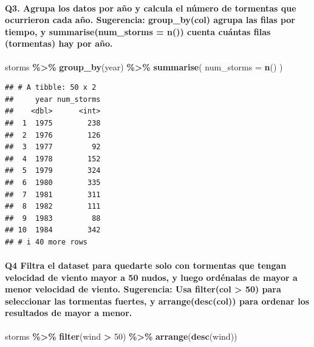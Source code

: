 \documentclass[
]{article}
\newenvironment{Shaded}{\begin{snugshade}}{\end{snugshade}}
\newcommand{\AttributeTok}[1]{\textcolor[rgb]{0.13,0.29,0.53}{#1}}
\newcommand{\DecValTok}[1]{\textcolor[rgb]{0.00,0.00,0.81}{#1}}
\newcommand{\FunctionTok}[1]{\textcolor[rgb]{0.13,0.29,0.53}{\textbf{#1}}}
\newcommand{\NormalTok}[1]{#1}
\newcommand{\SpecialCharTok}[1]{\textcolor[rgb]{0.81,0.36,0.00}{\textbf{#1}}}
\begin{document}
\paragraph{Q3. Agrupa los datos por año y calcula el número de tormentas
que ocurrieron cada año. Sugerencia: group\_by(col) agrupa las filas por
tiempo, y summarise(num\_storms = n()) cuenta cuántas filas (tormentas)
hay por
año.}\label{q3.-agrupa-los-datos-por-auxf1o-y-calcula-el-nuxfamero-de-tormentas-que-ocurrieron-cada-auxf1o.-sugerencia-group_bycol-agrupa-las-filas-por-tiempo-y-summarisenum_storms-n-cuenta-cuuxe1ntas-filas-tormentas-hay-por-auxf1o.}

\begin{Shaded}
\begin{Highlighting}[]
\NormalTok{storms }\SpecialCharTok{\%\textgreater{}\%}
  \FunctionTok{group\_by}\NormalTok{(year) }\SpecialCharTok{\%\textgreater{}\%}
  \FunctionTok{summarise}\NormalTok{(}
    \AttributeTok{num\_storms =} \FunctionTok{n}\NormalTok{()}
\NormalTok{  )}
\end{Highlighting}
\end{Shaded}

\begin{verbatim}
## # A tibble: 50 x 2
##     year num_storms
##    <dbl>      <int>
##  1  1975        238
##  2  1976        126
##  3  1977         92
##  4  1978        152
##  5  1979        324
##  6  1980        335
##  7  1981        311
##  8  1982        111
##  9  1983         88
## 10  1984        342
## # i 40 more rows
\end{verbatim}

\paragraph{Q4 Filtra el dataset para quedarte solo con tormentas que
tengan velocidad de viento mayor a 50 nudos, y luego ordénalas de mayor
a menor velocidad de viento. Sugerencia: Usa filter(col \textgreater{}
50) para seleccionar las tormentas fuertes, y arrange(desc(col)) para
ordenar los resultados de mayor a
menor.}\label{q4-filtra-el-dataset-para-quedarte-solo-con-tormentas-que-tengan-velocidad-de-viento-mayor-a-50-nudos-y-luego-orduxe9nalas-de-mayor-a-menor-velocidad-de-viento.-sugerencia-usa-filtercol-50-para-seleccionar-las-tormentas-fuertes-y-arrangedesccol-para-ordenar-los-resultados-de-mayor-a-menor.}

\begin{Shaded}
\begin{Highlighting}[]
\NormalTok{storms }\SpecialCharTok{\%\textgreater{}\%}
  \FunctionTok{filter}\NormalTok{(wind }\SpecialCharTok{\textgreater{}} \DecValTok{50}\NormalTok{) }\SpecialCharTok{\%\textgreater{}\%}
  \FunctionTok{arrange}\NormalTok{(}\FunctionTok{desc}\NormalTok{(wind))}
\end{Highlighting}
\end{Shaded}
\end{document}
